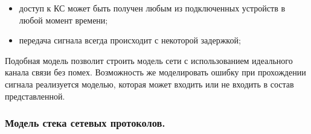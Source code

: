 \documentclass[12pt]{report}
\begin{document}
    \begin{itemize}
        \item доступ к КС может быть получен любым из подключенных устройств в любой момент времени;
        \item передача сигнала всегда происходит с некоторой задержкой;
    \end{itemize}

    Подобная модель позволит строить модель сети с использованием идеального канала связи без помех. Возможность же моделировать ошибку при прохождении сигнала реализуется моделью, которая может входить или не входить в состав представленной.

    \subsubsection{Модель стека сетевых протоколов. }
\end{document}
